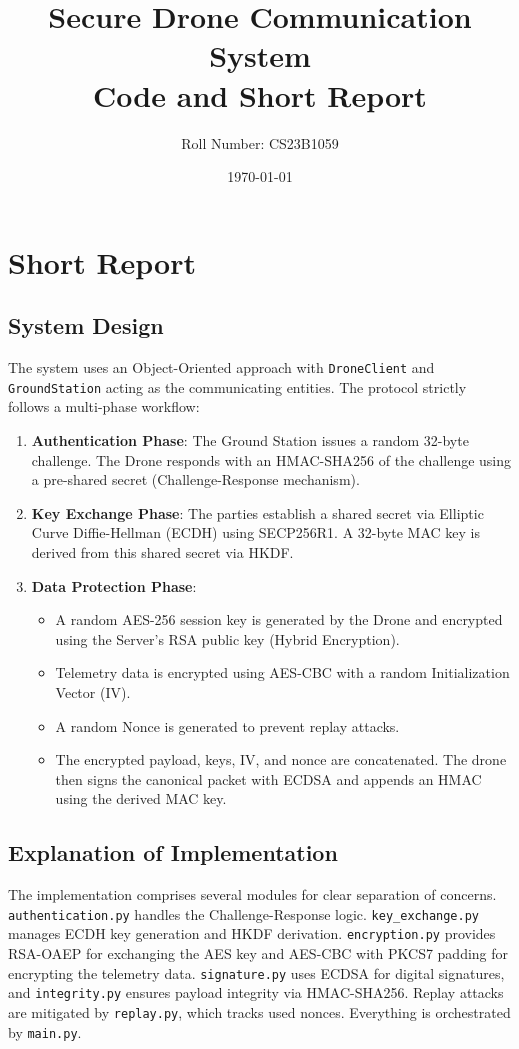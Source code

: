 \documentclass[12pt,a4paper]{article}
\title{\textbf{Secure Drone Communication System}\\ \large Code and Short Report}
\author{Roll Number: CS23B1059}
\date{\today}
\begin{document}
\maketitle

\section{Short Report}

\subsection{System Design}
The system uses an Object-Oriented approach with \texttt{DroneClient} and \texttt{GroundStation} acting as the communicating entities. The protocol strictly follows a multi-phase workflow:
\begin{enumerate}
    \item \textbf{Authentication Phase}: The Ground Station issues a random 32-byte challenge. The Drone responds with an HMAC-SHA256 of the challenge using a pre-shared secret (Challenge-Response mechanism).
    \item \textbf{Key Exchange Phase}: The parties establish a shared secret via Elliptic Curve Diffie-Hellman (ECDH) using SECP256R1. A 32-byte MAC key is derived from this shared secret via HKDF.
    \item \textbf{Data Protection Phase}: 
    \begin{itemize}
        \item A random AES-256 session key is generated by the Drone and encrypted using the Server's RSA public key (Hybrid Encryption).
        \item Telemetry data is encrypted using AES-CBC with a random Initialization Vector (IV).
        \item A random Nonce is generated to prevent replay attacks.
        \item The encrypted payload, keys, IV, and nonce are concatenated. The drone then signs the canonical packet with ECDSA and appends an HMAC using the derived MAC key.
    \end{itemize}
\end{enumerate}

\subsection{Explanation of Implementation}
The implementation comprises several modules for clear separation of concerns. \texttt{authentication.py} handles the Challenge-Response logic. \texttt{key\_exchange.py} manages ECDH key generation and HKDF derivation. \texttt{encryption.py} provides RSA-OAEP for exchanging the AES key and AES-CBC with PKCS7 padding for encrypting the telemetry data. \texttt{signature.py} uses ECDSA for digital signatures, and \texttt{integrity.py} ensures payload integrity via HMAC-SHA256. Replay attacks are mitigated by \texttt{replay.py}, which tracks used nonces. Everything is orchestrated by \texttt{main.py}.
\end{document}
